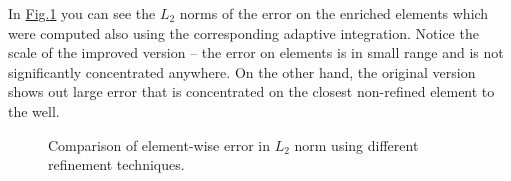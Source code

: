 \documentclass[preprint,12pt]{elsarticle}
\newcommand{\fig}[1]{\hyperref[#1]{Fig.\ref{#1}}}
\newcommand{\notePE}[1]{{\color{Orange} \textbf{PE: } \textit{#1}}}
\begin{document}
In \fig{fig:adapt_refinement_norm} you can see the $L_2$ norms of the error on the enriched elements which 
were computed also using the corresponding adaptive integration. Notice the scale of the improved version -- 
the error on elements is in small range and is not significantly concentrated anywhere. On the other hand, 
the original version shows out large error that is concentrated on the closest non-refined element to the well.

\begin{figure}[!htb]
  \centering    
  \hspace{0pt}
  \caption[Adaptive refinement comparison]
  {Comparison of element-wise error in $L_2$ norm using different refinement techniques.
  }
  \label{fig:adapt_refinement_norm}
\end{figure}
\end{document}
